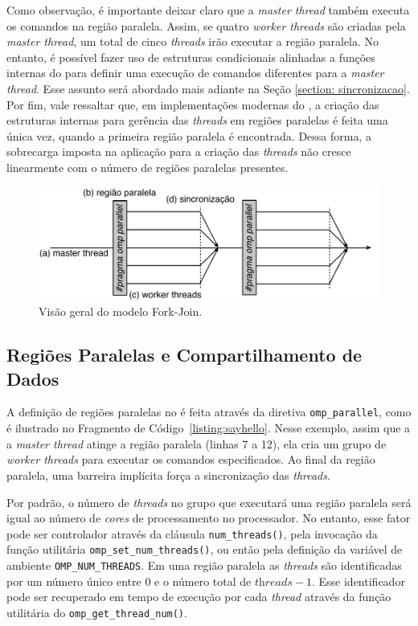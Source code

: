 \documentclass{SBCbookchapter}
\begin{document}
		Como observação, é importante deixar claro que a \textit{master
		thread} também executa os comandos na região paralela. Assim, se
		quatro \textit{worker threads} são criadas pela \textit{master
		thread}, um total de cinco \textit{threads} irão executar a
		região paralela.  No entanto, é possível fazer uso de estruturas
		condicionais alinhadas a funções internas do \openmp para
		definir uma execução de comandos diferentes para a
		\textit{master thread}. Esse assunto será abordado mais adiante
		na Seção \ref{section: sincronizacao}. Por fim, vale ressaltar
		que, em implementações modernas do \openmp, a criação das
		estruturas internas para gerência das \textit{threads} em
		regiões paralelas é feita uma única vez, quando a primeira
		região paralela é encontrada. Dessa forma, a sobrecarga imposta
		na aplicação para a criação das \textit{threads} não cresce
		linearmente com o número de regiões paralelas presentes.

		\begin{figure}[t]
			\centering
			\includegraphics[width=0.8\linewidth]{img/fork-join}
			\caption{Visão geral do modelo Fork-Join.}\label{fig:fork-join}
		\end{figure}

	\subsection{Regiões Paralelas e Compartilhamento de Dados}

		A definição de regiões paralelas no \openmp é feita através da
		diretiva \texttt{omp\_parallel}, como é ilustrado no Fragmento
		de Código~\ref{listing:sayhello}.  Nesse exemplo, assim que a a
		\textit{master thread} atinge a região paralela (linhas 7 a 12),
		ela cria um grupo de \textit{worker threads} para executar os
		comandos especificados. Ao final da região paralela, uma
		barreira implícita força a sincronização das \textit{threads}.
		
		Por padrão, o número de \textit{threads} no grupo que executará
		uma região paralela será igual ao número de \textit{cores} de
		processamento no processador. No entanto, esse fator pode ser
		controlador através da cláusula \texttt{num\_threads()}, pela
		invocação da função utilitária
		\texttt{omp\_set\_num\_threads()}, ou então pela definição da
		variável de ambiente \texttt{OMP\_NUM\_THREADS}. Em uma região
		paralela as \textit{threads} são identificadas por um número
		único entre $0$ e o número total de $\textit{threads} - 1$.
		Esse identificador pode ser recuperado em tempo de execução por
		cada \textit{thread} através da função utilitária do \openmp
		\texttt{omp\_get\_thread\_num()}.
\end{document}
